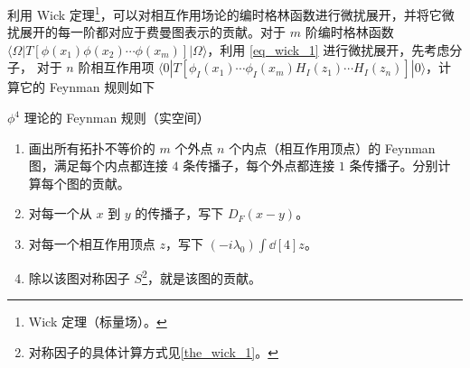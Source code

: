 

利用 Wick 定理\footnote{Wick 定理（标量场）。}，可以对相互作用场论的编时格林函数进行微扰展开，并将它微扰展开的每一阶都对应于费曼图表示的贡献。对于 $m$ 阶编时格林函数 $\langle \Omega|T[\phi(x_1)\phi(x_2)\cdots \phi(x_m)]|\Omega\rangle$，利用 \autoref{eq_wick_1}  进行微扰展开，先考虑分子，
对于 $n$ 阶相互作用项 $\langle 0| T[\phi_I(x_1)\cdots \phi_I(x_m) H_I(z_1)\cdots H_I(z_n)]|0\rangle$，计算它的 Feynman 规则如下
\begin{theorem}{$\phi^4$ 理论的 Feynman 规则（实空间）}
\begin{enumerate}
\item 画出所有拓扑不等价的 $m$ 个外点 $n$ 个内点（相互作用顶点）的 Feynman 图，满足每个内点都连接 $4$ 条传播子，每个外点都连接 $1$ 条传播子。分别计算每个图的贡献。
\item 对每一个从 $x$ 到 $y$ 的传播子，写下 $D_F(x-y)$。
\item 对每一个相互作用顶点 $z$，写下 $(-i\lambda_0)\int \dd[4]z$。
\item 除以该图对称因子 $S$\footnote{对称因子的具体计算方式见\autoref{the_wick_1}。}，就是该图的贡献。
\end{enumerate}
\end{theorem}
